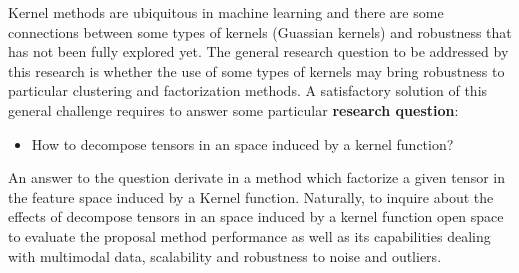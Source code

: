 \documentclass[letterpaper,12pt]{article}
\begin{document}
Kernel methods are ubiquitous in machine learning and there are some connections between some types of kernels (Guassian kernels) and robustness that has not been fully explored yet. The general research question to be addressed by this research is whether the use of some types of kernels may bring robustness to particular clustering and factorization methods. A satisfactory solution of this general challenge requires to answer some particular \textbf{research question}: 

\begin{itemize}
 \item How to decompose tensors in an space induced by a kernel function? %
\end{itemize}

An answer to the question derivate in a method which factorize a given tensor in the feature space induced by a Kernel function. Naturally, to inquire about the effects of decompose tensors in an space induced by a kernel function open space to evaluate the proposal method performance as well as its capabilities dealing with multimodal data, scalability and robustness to noise and outliers.




\end{document}
